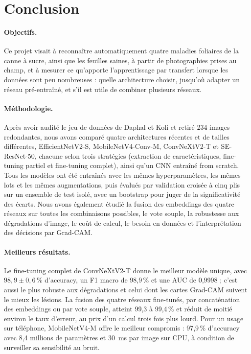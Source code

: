 \section{Conclusion}
\label{sec:conclusion}

\paragraph{Objectifs.} Ce projet visait à reconnaître automatiquement quatre maladies foliaires de la canne à sucre, ainsi que les feuilles saines, à partir de photographies prises au champ, et à mesurer ce qu'apporte l'apprentissage par transfert lorsque les données sont peu nombreuses : quelle architecture choisir, jusqu'où adapter un réseau pré-entraîné, et s'il est utile de combiner plusieurs réseaux.

\paragraph{Méthodologie.} Après avoir audité le jeu de données de Daphal et Koli et retiré 234 images redondantes, nous avons comparé quatre architectures récentes et de tailles différentes, EfficientNetV2-S, MobileNetV4-Conv-M, ConvNeXtV2-T et SE-ResNet-50, chacune selon trois stratégies (extraction de caractéristiques, fine-tuning partiel et fine-tuning complet), ainsi qu'un CNN entraîné from scratch. Tous les modèles ont été entraînés avec les mêmes hyperparamètres, les mêmes lots et les mêmes augmentations, puis évalués par validation croisée à cinq plis sur un ensemble de test isolé, avec un bootstrap pour juger de la significativité des écarts. Nous avons également étudié la fusion des embeddings des quatre réseaux sur toutes les combinaisons possibles, le vote souple, la robustesse aux dégradations d'image, le coût de calcul, le besoin en données et l'interprétation des décisions par Grad-CAM.

\paragraph{Meilleurs résultats.} Le fine-tuning complet de ConvNeXtV2-T donne le meilleur modèle unique, avec $98{,}9 \pm 0{,}6$\,\% d'accuracy, un F1 macro de 98,9\,\% et une AUC de 0,9998 ; c'est aussi le plus robuste aux dégradations et celui dont les cartes Grad-CAM suivent le mieux les lésions. La fusion des quatre réseaux fine-tunés, par concaténation des embeddings ou par vote souple, atteint 99,3 à 99,4\,\% et réduit de moitié environ le taux d'erreur, au prix d'un calcul trois fois plus lourd. Pour un usage sur téléphone, MobileNetV4-M offre le meilleur compromis : 97,9\,\% d'accuracy avec 8,4 millions de paramètres et 30~ms par image sur CPU, à condition de surveiller sa sensibilité au bruit.

